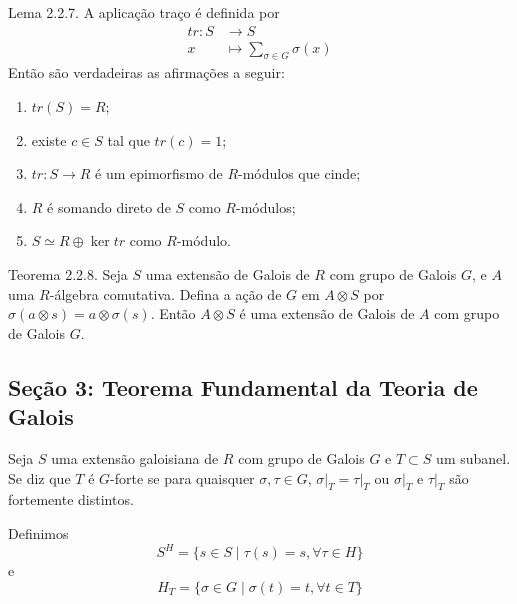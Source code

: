 \documentclass{beamer}
\begin{document}
\begin{frame}{Lema 2.2.7.}
    A aplicação traço é definida por 
    \begin{align*}
        tr : S &\rightarrow S \\
        x &\mapsto \sum_{\sigma\in G} \sigma(x)
    \end{align*}
    Então são verdadeiras as afirmações a seguir:
    \begin{enumerate}
        \item $tr(S) = R$;
        \item existe $c \in S$ tal que $tr(c) = 1$;
        \item $tr:S\rightarrow R$ é um epimorfismo de $R$-módulos que cinde;
        \item $R$ é somando direto de $S$ como $R$-módulos;
        \item $S\simeq R \oplus \ker{tr}$ como $R$-módulo.
    \end{enumerate}
\end{frame}

\begin{frame}{Teorema 2.2.8.}
    Seja $S$ uma extensão de Galois de $R$ com grupo de Galois $G$, e $A$ uma $R$-álgebra comutativa. Defina a ação de $G$ em $A\otimes S$ por $\sigma(a\otimes s) = a \otimes\sigma(s)$. Então $A\otimes S$ é uma extensão de Galois de $A$ com grupo de Galois $G$.
\end{frame}

            \subsection{Seção 3: Teorema Fundamental da Teoria de Galois}
\begin{frame}
    Seja $S$ uma extensão galoisiana de $R$ com grupo de Galois $G$ e $T \subset S$ um subanel. Se diz que $T$ é $G$-forte se para quaisquer $\sigma,\tau \in G$, $\left.\sigma\right|_T = \left.\tau\right|_T$ ou $\left. \sigma \right|_T$ e $\left. \tau \right|_T$ são fortemente distintos.
    
    \vspace{18pt}
    
    Definimos \[S^H = \{s \in S \mid \tau(s) = s, \forall \tau \in H\}\] e \[H_T = \{\sigma \in G \mid \sigma(t) = t, \forall t \in T\}\]
\end{frame}
\end{document}

